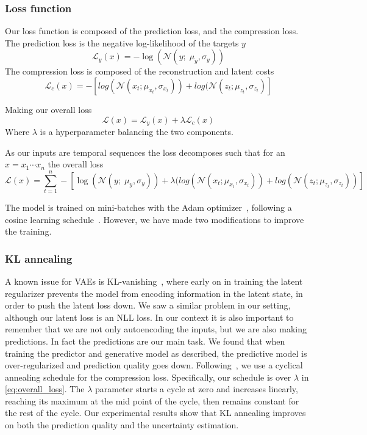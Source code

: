 \documentclass[../main.tex]{subfiles}
\begin{document}
\subsubsection{Loss function}

Our loss function is composed of the prediction loss, and the compression loss. The prediction loss is the negative log-likelihood of the targets $y$
$$
    \mathcal{L}_y(x) =  -\log (\mathcal{N}(y; \; \mu_y, \sigma_y))
$$
The compression loss is composed of the reconstruction and latent costs
$$
    \mathcal{L}_c(x) = -[log(\mathcal{N}(x_t; \mu_{x_t}, \sigma_{x_t}) ) + log(\mathcal{N}(z_t; \mu_{z_t}, \sigma_{z_t})]
$$

Making our overall loss
\begin{equation}
    \label{eq:overall_loss}
    \mathcal{L}(x) = \mathcal{L}_{y}(x) + \lambda \mathcal{L}_c(x)
\end{equation}{}
Where $\lambda$ is a hyperparameter balancing the two components.

As our inputs are temporal sequences the loss decomposes such that for an $x={x_1 \cdots x_n}$ the overall loss
\begin{equation}
    \label{eq:detailed_loss}
    \mathcal{L}(x) = \sum_{t=1}^{n} -[\log (\mathcal{N}(y; \; \mu_y, \sigma_y)) + \lambda(log(\mathcal{N}(x_t; \mu_{x_t}, \sigma_{x_t}) ) + log(\mathcal{N}(z_t; \mu_{z_t}, \sigma_{z_t}))]
\end{equation}{}

The model is trained on mini-batches with the Adam optimizer~\citep{kingma2014adam}, following a cosine learning schedule~\citep{loshchilov2016sgdr}. However, we have made two modifications to improve the training.

\subsubsection{KL annealing}

A known issue for VAEs is KL-vanishing~\citep{bowman2015generating}, where early on in training the latent regularizer prevents the model from encoding information in the latent state, in order to push the latent loss down. We saw a similar problem in our setting, although our latent loss is an NLL loss. In our context it is also important to remember that we are not only autoencoding the inputs, but we are also making predictions. In fact the predictions are our main task. We found that when training the predictor and generative model as described, the predictive model is over-regularized and prediction quality goes down. Following~\citep{liu2019cyclical}, we use a cyclical annealing schedule for the compression loss. Specifically, our schedule is over $\lambda$ in \cref{eq:overall_loss}. The $\lambda$ parameter starts a cycle at zero and increases linearly, reaching its maximum at the mid point of the cycle, then remains constant for the rest of the cycle. Our experimental results show that KL annealing improves on both the prediction quality and the uncertainty estimation. 
\end{document}
